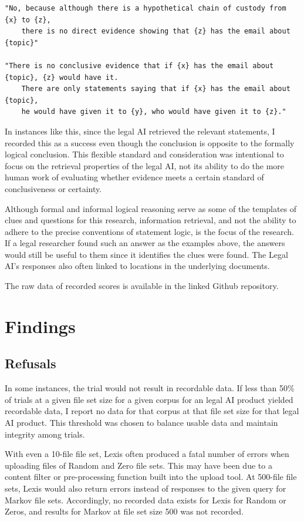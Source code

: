 \documentclass[
]{article}
\begin{document}
\begin{verbatim}
"No, because although there is a hypothetical chain of custody from {x} to {z}, 
    there is no direct evidence showing that {z} has the email about {topic}"

"There is no conclusive evidence that if {x} has the email about {topic}, {z} would have it. 
    There are only statements saying that if {x} has the email about {topic}, 
    he would have given it to {y}, who would have given it to {z}."
\end{verbatim}

In instances like this, since the legal AI retrieved the relevant
statements, I recorded this as a success even though the conclusion is
opposite to the formally logical conclusion. This flexible standard and
consideration was intentional to focus on the retrieval properties of
the legal AI, not its ability to do the more human work of evaluating
whether evidence meets a certain standard of conclusiveness or
certainty.

Although formal and informal logical reasoning serve as some of the
templates of clues and questions for this research, information
retrieval, and not the ability to adhere to the precise conventions of
statement logic, is the focus of the research. If a legal researcher
found such an answer as the examples above, the answers would still be
useful to them since it identifies the clues were found. The Legal AI's
responses also often linked to locations in the underlying documents.

The raw data of recorded scores is available in the linked Github
repository.

\section{Findings}\label{findings}

\subsection{Refusals}\label{refusals}

In some instances, the trial would not result in recordable data. If
less than 50\% of trials at a given file set size for a given corpus for
an legal AI product yielded recordable data, I report no data for that
corpus at that file set size for that legal AI product. This threshold
was chosen to balance usable data and maintain integrity among trials.

With even a 10-file file set, Lexis often produced a fatal number of
errors when uploading files of Random and Zero file sets. This may have
been due to a content filter or pre-processing function built into the
upload tool. At 500-file file sets, Lexis would also return errors
instead of responses to the given query for Markov file sets.
Accordingly, no recorded data exists for Lexis for Random or Zeros, and
results for Markov at file set size 500 was not recorded.
\end{document}
